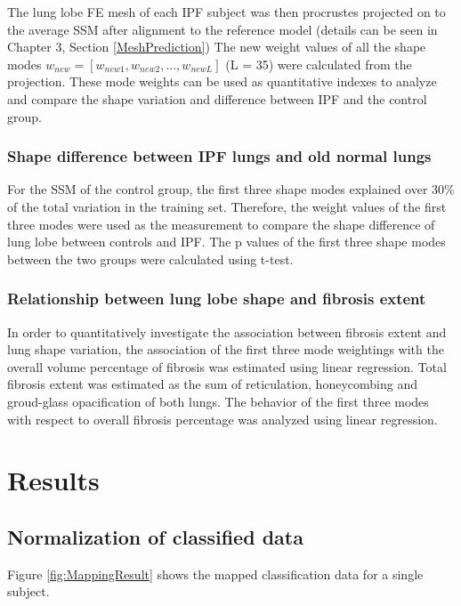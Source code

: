 The lung lobe FE mesh of each IPF subject was then procrustes projected on to the average SSM after alignment to the reference model (details can be seen in Chapter 3, Section \ref{MeshPrediction}) The new weight values of all the shape modes $w_{new} = [w_{new1}, w_{new2},...,w_{newL}]$ (L = 35) were calculated from the projection. These mode weights can be used as quantitative indexes to analyze and compare the shape variation and difference between IPF and the control group.

\subsubsection{Shape difference between IPF lungs and old normal lungs}

For the SSM of the control group, the first three shape modes explained over 30\% of the total variation in the training set. Therefore, the weight values of the first three modes were used as the measurement to compare the shape difference of lung lobe between controls and IPF. The p values of the first three shape modes between the two groups were calculated using t-test.

\subsubsection{Relationship between lung lobe shape and fibrosis extent}
In order to quantitatively investigate the association between fibrosis extent and lung shape variation, the association of the first three mode weightings with the overall volume percentage of fibrosis was estimated using linear regression. Total fibrosis extent was estimated as the sum of reticulation,  honeycombing and groud-glass opacification of both lungs. The behavior of the first three modes with respect to overall fibrosis percentage was analyzed using linear regression.

\section{Results}
\subsection{Normalization of classified data}
Figure \ref{fig:MappingResult} shows the mapped classification data for a single subject.

